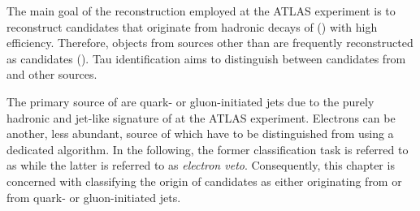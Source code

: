 The main goal of the \tauhadvis reconstruction employed at the ATLAS
experiment is to reconstruct \tauhadvis candidates that originate from
hadronic decays of \tauleptons (\truetauhadvis) with high
efficiency. Therefore, objects from sources other than \tauhad are
frequently reconstructed as \tauhadvis candidates
(\faketauhadvis). Tau identification aims to distinguish between
\tauhadvis candidates from \tauhad and other sources.

The primary source of \faketauhadvis are quark- or gluon-initiated
jets due to the purely hadronic and jet-like signature of \tauhadvis
at the ATLAS experiment. Electrons can be another, less abundant,
source of \faketauhadvis which have to be distinguished from
\truetauhadvis using a dedicated algorithm. In the following, the
former classification task is referred to as \tauid while the latter
is referred to as \emph{electron veto}. Consequently, this chapter is
concerned with classifying the origin of \tauhadvis candidates as
either originating from \tauhad or from quark- or gluon-initiated
jets.

